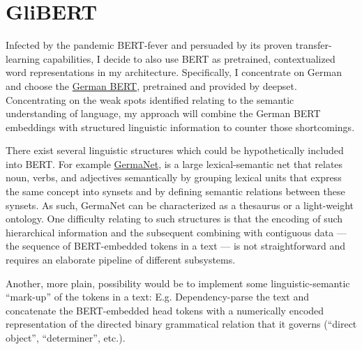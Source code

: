 \section{GliBERT}

Infected by the pandemic BERT-fever and persuaded by its proven transfer-learning
capabilities, I decide to also use BERT as pretrained, contextualized word
representations in my architecture. Specifically, I concentrate on German and choose
the \href{https://deepset.ai/german-bert}{German BERT}, pretrained and provided
by deepset. Concentrating on the weak spots identified relating to the semantic
understanding of language, my approach will combine the German BERT embeddings with
structured linguistic information to counter those shortcomings.

There exist several linguistic structures which could
be hypothetically included into BERT. For example
\href{https://uni-tuebingen.de/en/faculties/faculty-of-humanities/departments/modern-languages/department-of-linguistics/chairs/general-and-computational-linguistics/ressources/lexica/germanet/}{GermaNet},
\citep{hamp1997germanet} is a large lexical-semantic net
that relates noun, verbs, and adjectives semantically
by grouping lexical units that express the same concept
into synsets and by defining semantic relations between
these synsets. As such, GermaNet can be characterized as
a thesaurus or a light-weight ontology. One difficulty
relating to such structures is that the encoding of such
hierarchical information and the subsequent combining
with contiguous data --- the sequence of BERT-embedded
tokens in a text --- is not straightforward and requires
an elaborate pipeline of different subsystems.

Another, more plain, possibility would be to implement some linguistic-semantic ``mark-up'' of
the tokens in a text: E.g. Dependency-parse the text and concatenate the BERT-embedded head tokens
with a numerically encoded representation of the directed binary grammatical relation
that it governs (``direct object'', ``determiner'', etc.).



